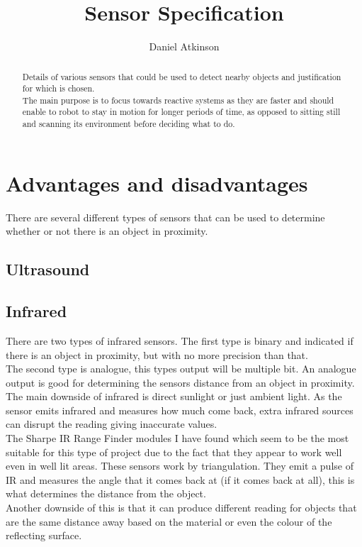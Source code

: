 \documentclass{article}
\begin{document}
\title{Sensor Specification}

\author{Daniel Atkinson}

\maketitle

\begin{abstract}

Details of various sensors that could be used to detect nearby objects and justification for which is chosen.
\\The main purpose is to focus towards reactive systems as they are faster and should enable to robot to stay in motion for longer periods of time, as opposed to sitting still and scanning its environment before deciding what to do.

\end{abstract}


\section{Advantages and disadvantages}
There are several different types of sensors that can be used to determine whether or not there is an object in proximity.

\subsection{Ultrasound}

\subsection{Infrared}
There are two types of infrared sensors.  The first type is binary and indicated if there is an object in proximity, but with no more precision than that.
\\The second type is analogue, this types output will be multiple bit.  An analogue output is good for determining the sensors distance from an object in proximity.
\\The main downside of infrared is direct sunlight or just ambient light.  As the sensor emits infrared and measures how much come back, extra infrared sources can disrupt the reading giving inaccurate values.
\\The Sharpe IR Range Finder modules I have found which seem to be the most suitable for this type of project due to the fact that they appear to work well even in well lit areas.  These sensors work by triangulation.  They emit a pulse of IR and measures the angle that it comes back at (if it comes back at all), this is what determines the distance from the object.
\\Another downside of this is that it can produce different reading for objects that are the same distance away based on the material or even the colour of the reflecting surface.
\end{document}
